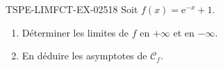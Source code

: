\begin{exercice}{TSPE-LIMFCT-EX-025}{1}{8}
Soit $f(x) = \mathrm{e}^{-x} + 1$.
\begin{enumerate}
  \item Déterminer les limites de $f$ en $+\infty$ et en $-\infty$.
  \item En déduire les asymptotes de $\mathcal{C}_f$.
\end{enumerate}
\end{exercice}
